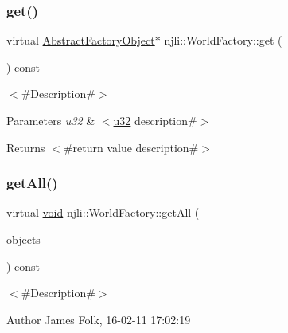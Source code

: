 \subsubsection{\texorpdfstring{get()}{get()}}
{\footnotesize\ttfamily virtual \mbox{\hyperlink{classnjli_1_1_abstract_factory_object}{Abstract\+Factory\+Object}}$\ast$ njli\+::\+World\+Factory\+::get (\begin{DoxyParamCaption}\item[{const \mbox{\hyperlink{_util_8h_a10e94b422ef0c20dcdec20d31a1f5049}{u32}}}]{ }\end{DoxyParamCaption}) const\hspace{0.3cm}{\ttfamily [virtual]}}

$<$\#\+Description\#$>$


\begin{DoxyParams}{Parameters}
{\em u32} & $<$\mbox{\hyperlink{_util_8h_a10e94b422ef0c20dcdec20d31a1f5049}{u32}} description\#$>$\\
\hline
\end{DoxyParams}
\begin{DoxyReturn}{Returns}
$<$\#return value description\#$>$ 
\end{DoxyReturn}
\mbox{\label{classnjli_1_1_world_factory_af184be71213aee7dc980e6088b498c79}} 
\subsubsection{\texorpdfstring{get\+All()}{getAll()}}
{\footnotesize\ttfamily virtual \mbox{\hyperlink{_thread_8h_af1e856da2e658414cb2456cb6f7ebc66}{void}} njli\+::\+World\+Factory\+::get\+All (\begin{DoxyParamCaption}\item[{std\+::vector$<$ \mbox{\hyperlink{classnjli_1_1_abstract_factory_object}{Abstract\+Factory\+Object}} $\ast$$>$ \&}]{objects }\end{DoxyParamCaption}) const\hspace{0.3cm}{\ttfamily [virtual]}}



$<$\#\+Description\#$>$ 

\begin{DoxyAuthor}{Author}
James Folk, 16-\/02-\/11 17\+:02\+:19
\end{DoxyAuthor}

